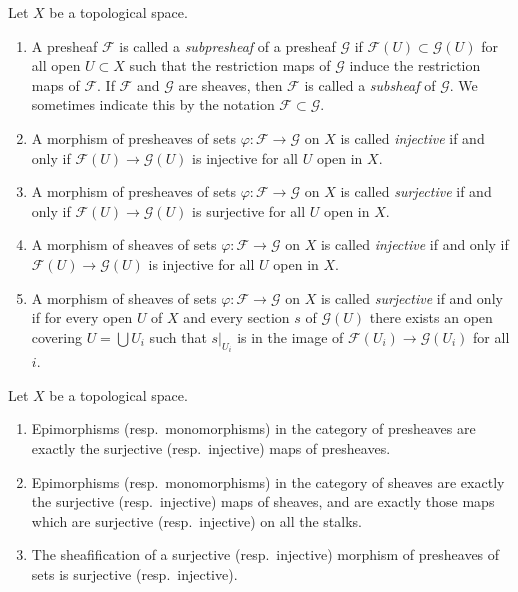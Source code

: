 \begin{definition}
\label{definition-injective-surjective}
Let $X$ be a topological space.
\begin{enumerate}
\item A presheaf $\mathcal{F}$ is called a {\it subpresheaf} of a presheaf
$\mathcal{G}$ if $\mathcal{F}(U) \subset \mathcal{G}(U)$ for all open
$U \subset X$ such that the restriction maps of $\mathcal{G}$ induce the
restriction maps of $\mathcal{F}$. If $\mathcal{F}$ and
$\mathcal{G}$ are sheaves, then $\mathcal{F}$ is called a {\it subsheaf}
of $\mathcal{G}$. We sometimes indicate this by the notation
$\mathcal{F} \subset \mathcal{G}$.
\item A morphism of presheaves of sets $\varphi : \mathcal{F} \to \mathcal{G}$
on $X$ is called {\it injective} if and only if
$\mathcal{F}(U) \to \mathcal{G}(U)$ is injective for all $U$ open in $X$.
\item A morphism of presheaves of sets $\varphi : \mathcal{F} \to \mathcal{G}$
on $X$ is called {\it surjective} if and only if
$\mathcal{F}(U) \to \mathcal{G}(U)$ is surjective for all $U$ open in $X$.
\item A morphism of sheaves of sets $\varphi : \mathcal{F} \to \mathcal{G}$
on $X$ is called {\it injective} if and only if
$\mathcal{F}(U) \to \mathcal{G}(U)$ is injective for all $U$ open in $X$.
\item A morphism of sheaves of sets $\varphi : \mathcal{F} \to \mathcal{G}$
on $X$ is called {\it surjective} if and only if for every open
$U$ of $X$ and every section $s$ of $\mathcal{G}(U)$ there exists an
open covering $U = \bigcup U_i$ such that $s|_{U_i}$ is in
the image of $\mathcal{F}(U_i) \to \mathcal{G}(U_i)$ for all $i$.
\end{enumerate}
\end{definition}


\begin{lemma}
\label{lemma-characterize-epi-mono}
Let $X$ be a topological space.
\begin{enumerate}
\item Epimorphisms (resp.\ monomorphisms) in the category of
presheaves are exactly the surjective (resp.\ injective) maps
of presheaves.
\item Epimorphisms (resp.\ monomorphisms) in the category of
sheaves are exactly the surjective (resp.\ injective) maps
of sheaves, and are exactly those maps which are surjective
(resp.\ injective) on all the stalks.
\item The sheafification of a surjective (resp.\ injective)
morphism of presheaves of sets is surjective (resp.\ injective).
\end{enumerate}
\end{lemma}

